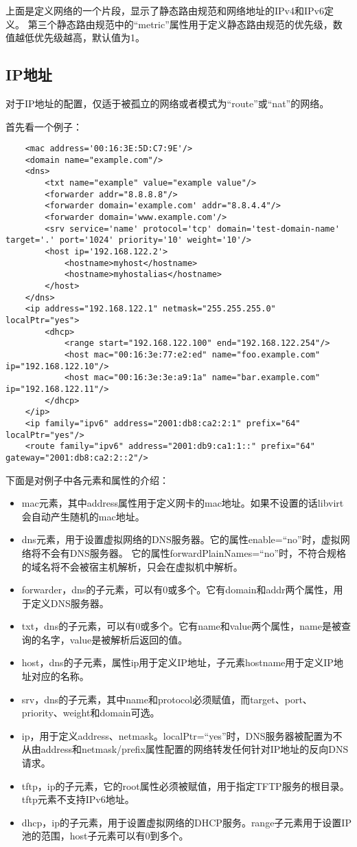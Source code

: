 \documentclass[a4paper,left=2.5cm,right=2.5cm,11pt]{article}
\begin{document}
	上面是定义网络的一个片段，显示了静态路由规范和网络地址的IPv4和IPv6定义。
	第三个静态路由规范中的“metric”属性用于定义静态路由规范的优先级，数值越低优先级越高，默认值为1。

\subsection{IP地址}
	对于IP地址的配置，仅适于被孤立的网络或者模式为“route”或“nat”的网络。\par

	首先看一个例子：
	\begin{lstlisting}
	<mac address='00:16:3E:5D:C7:9E'/>
	<domain name="example.com"/>
	<dns>
		<txt name="example" value="example value"/>
		<forwarder addr="8.8.8.8"/>
		<forwarder domain='example.com' addr="8.8.4.4"/>
		<forwarder domain='www.example.com'/>
		<srv service='name' protocol='tcp' domain='test-domain-name' target='.' port='1024' priority='10' weight='10'/>
		<host ip='192.168.122.2'>
			<hostname>myhost</hostname>
			<hostname>myhostalias</hostname>
		</host>
	</dns>
	<ip address="192.168.122.1" netmask="255.255.255.0" localPtr="yes">
		<dhcp>
			<range start="192.168.122.100" end="192.168.122.254"/>
			<host mac="00:16:3e:77:e2:ed" name="foo.example.com" ip="192.168.122.10"/>
			<host mac="00:16:3e:3e:a9:1a" name="bar.example.com" ip="192.168.122.11"/>
		</dhcp>
	</ip>
	<ip family="ipv6" address="2001:db8:ca2:2:1" prefix="64" localPtr="yes"/>
	<route family="ipv6" address="2001:db9:ca1:1::" prefix="64" gateway="2001:db8:ca2:2::2"/>
	\end{lstlisting}

	下面是对例子中各元素和属性的介绍：
	\begin{itemize}
		\item mac元素，其中address属性用于定义网卡的mac地址。如果不设置的话libvirt会自动产生随机的mac地址。
		\item dns元素，用于设置虚拟网络的DNS服务器。它的属性enable=“no”时，虚拟网络将不会有DNS服务器。
			  它的属性forwardPlainNames=“no”时，不符合规格的域名将不会被宿主机解析，只会在虚拟机中解析。
		\item forwarder，dns的子元素，可以有0或多个。它有domain和addr两个属性，用于定义DNS服务器。
		\item txt，dns的子元素，可以有0或多个。它有name和value两个属性，name是被查询的名字，value是被解析后返回的值。
		\item host，dns的子元素，属性ip用于定义IP地址，子元素hostname用于定义IP地址对应的名称。
		\item srv，dns的子元素，其中name和protocol必须赋值，而target、port、priority、weight和domain可选。
		\item ip，用于定义address、netmask。localPtr=“yes”时，DNS服务器被配置为不从由address和netmask/prefix属性配置的网络转发任何针对IP地址的反向DNS请求。
		\item tftp，ip的子元素，它的root属性必须被赋值，用于指定TFTP服务的根目录。tftp元素不支持IPv6地址。
		\item dhcp，ip的子元素，用于设置虚拟网络的DHCP服务。range子元素用于设置IP池的范围，host子元素可以有0到多个。
	\end{itemize}
\end{document}
